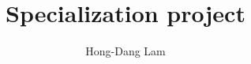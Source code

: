 \documentclass[12pt, a4paper]{article}
\title{Specialization project}
\author{Hong-Dang Lam}
\begin{document}
\maketitle
{}
\newpage
\begin{abstract}

\end{abstract}

\newpage
\tableofcontents
\newpage
\listoffigures
\newpage
\listoftables
\newpage
{}






\newpage
\nocite{*}


\end{document}
